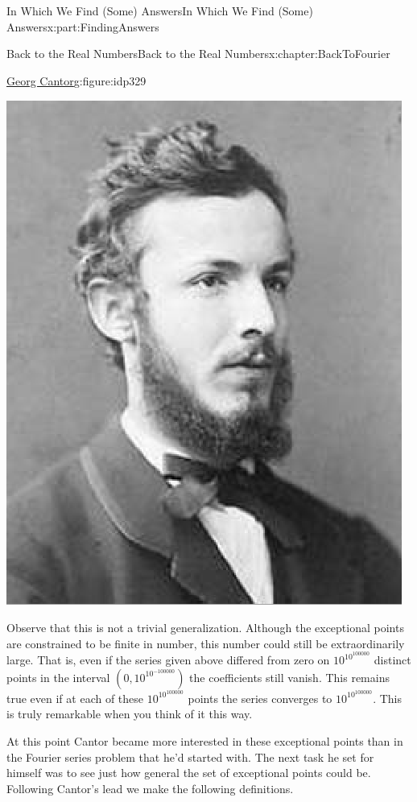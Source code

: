 \documentclass[oneside,10pt,]{book}
\numberwithin{equation}{section}
\begin{document}
\begin{partptx}{In Which We Find (Some) Answers}{}{In Which We Find (Some) Answers}{}{}{x:part:FindingAnswers}
\begin{chapterptx}{Back to the Real Numbers}{}{Back to the Real Numbers}{}{}{x:chapter:BackToFourier}
\begin{introduction}{}
\begin{figureptx}{\href{https://mathshistory.st-andrews.ac.uk/Biographies/Cantor/}{Georg Cantor}\protect\footnotemark{}}{g:figure:idp329}{}
\begin{image}{0.325}{0.35}{0.325}
\includegraphics[width=\linewidth]{images/Cantor.png}
\end{image}%
\tcblower
\end{figureptx}%
%
Observe that this is not a trivial generalization. Although the exceptional points are constrained to be finite in number, this number could still be extraordinarily large. That is, even if the series given above differed from zero on \(10^{10^{100000}}\) distinct points in the interval \((0, 10^{10^{-100000}})\) the coefficients still vanish. This remains true even if at each of these \(10^{10^{100000}}\) points the series converges to \(10^{10^{100000}}\). This is truly remarkable when you think of it this way.%
\par
At this point Cantor became more interested in these exceptional points than in the Fourier series problem that he'd started with. The next task he set for himself was to see just how general the set of exceptional points could be. Following Cantor's lead we make the following definitions.%

\end{introduction}
\end{chapterptx}
\end{partptx}
\end{document}
